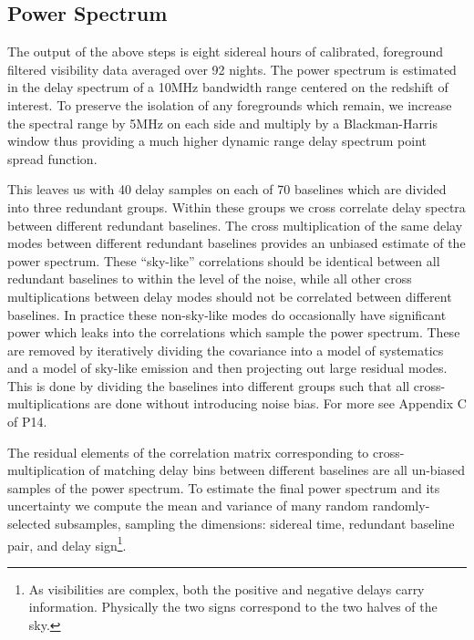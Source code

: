 \documentclass[preprint2]{aastex}
\begin{document}
\subsection{Power Spectrum}
\label{sec:power_spectrum}
The output of the above steps is eight sidereal hours of calibrated, foreground filtered visibility data averaged over 92 nights. The power spectrum is estimated in the delay spectrum of  a 10MHz bandwidth range centered on the redshift of interest. To preserve the isolation of any foregrounds which remain, we increase the spectral range by 5MHz on each side and multiply by a Blackman-Harris window thus providing a much higher dynamic range delay spectrum point spread function. 

This leaves us with 40 delay samples on each of 70 baselines which are divided into three redundant groups. Within these groups we cross correlate delay spectra between different redundant baselines.  The cross multiplication of the same delay modes between different redundant baselines provides an unbiased estimate of the power spectrum.  These ``sky-like'' correlations should be identical between all redundant baselines to within the level of the noise, while all other cross multiplications between delay modes should not be correlated between different baselines. In practice  these non-sky-like modes do occasionally have significant power which leaks into the correlations which sample the power spectrum.  These are removed by iteratively dividing the covariance into a model of systematics and a model of sky-like emission and then projecting out large residual modes. This is done by dividing the baselines into different groups such that all cross-multiplications are done without introducing noise bias.  For more see Appendix C of P14.

The residual elements of the correlation matrix corresponding to cross-multiplication of matching delay bins between different baselines are all un-biased samples of the power spectrum. To estimate the final power spectrum and its uncertainty we compute the mean and variance of many random randomly-selected subsamples, sampling the dimensions: sidereal time, redundant baseline pair, and delay sign\footnote{As visibilities are complex, both the positive and negative delays  carry  information. Physically the two signs correspond to the two halves of the sky.}.
\end{document}
